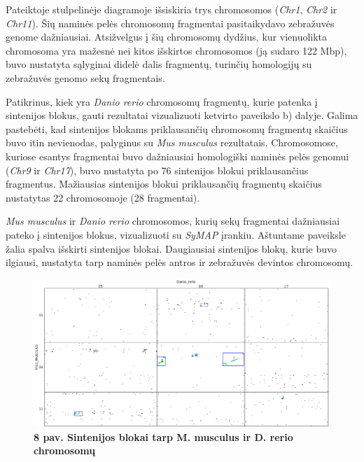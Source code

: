 \documentclass[12pt]{article}
\begin{document}
Pateiktoje stulpelinėje diagramoje išsiskiria trys chromosomos (\emph{Chr1},
\emph{Chr2} ir \emph{Chr11}). Šių naminės pelės chromosomų fragmentai
pasitaikydavo zebražuvės genome dažniausiai. Atsižvelgus į šių chromosomų
dydžius, kur vienuolikta chromosoma yra mažesnė nei kitos išskirtos chromosomos
(ją sudaro 122 Mbp\cite{MGI}), buvo nustatyta sąlyginai didelė dalis fragmentų,
turinčių homologijų su zebražuvės genomo sekų fragmentais.

Patikrinus, kiek yra \emph{Danio rerio} chromosomų fragmentų, kurie patenka į
sintenijos blokus, gauti rezultatai vizualizuoti ketvirto paveikslo b) dalyje.
Galima pastebėti, kad sintenijos blokams priklausančių chromosomų fragmentų
skaičius buvo itin nevienodas, palyginus su \emph{Mus musculus} rezultatais.
Chromosomose, kuriose esantys fragmentai buvo dažniausiai homologiški naminės
pelės genomui (\emph{Chr9} ir \emph{Chr17}), buvo nustatyta po 76 sintenijos
blokui priklausančius fragmentus. Mažiausias sintenijos blokui priklausančių
fragmentų skaičius nustatytas 22 chromosomoje (28 fragmentai).

\emph{Mus musculus} ir \emph{Danio rerio} chromosomos, kurių sekų fragmentai
dažniausiai pateko į sintenijos blokus, vizualizuoti su \emph{SyMAP} įrankiu.
Aštuntame paveiksle žalia spalva išskirti sintenijos blokai. Daugiausiai
sintenijos blokų, kurie buvo ilgiausi, nustatyta tarp naminės pelės antros
ir zebražuvės devintos chromosomų.

\newpage

\begin{figure}[htb]
    \begin{center}
        \includegraphics[width=0.8\linewidth]{../Figures/Blocks_Chr2_9.png}
        \vspace{-1\baselineskip}
        \caption*{\small\textbf{8 pav. Sintenijos blokai tarp M. musculus ir D.
        rerio chromosomų}}
        \label{fig:birds}
    \end{center}
\end{figure}
\end{document}
